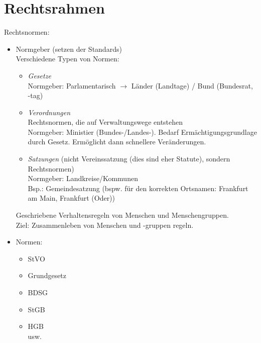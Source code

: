\section{Rechtsrahmen}
Rechtsnormen:
\begin{itemize}
\item Normgeber (setzen der Standards)\\
Verschiedene Typen von Normen:
\begin{itemize}
\item \emph{Gesetze}\\
Normgeber: Parlamentarisch $\to$ Länder (Landtage) / Bund (Bundesrat, -tag)
\item \emph{Verordnungen}\\
Rechtsnormen, die auf Verwaltungswege entstehen\\
Normgeber: Ministier (Bundes-/Landes-). Bedarf Ermächtigungsgrundlage durch Gesetz. Ermöglicht dann schnellere Veränderungen.
\item \emph{Satzungen} (nicht Vereinssatzung (dies sind eher Statute), sondern Rechtsnormen)\\
Normgeber: Landkreise/Kommunen\\
Bsp.: Gemeindesatzung (bspw. für den korrekten Ortsnamen: Frankfurt am Main, Frankfurt (Oder))
\end{itemize}
Geschriebene Verhaltensregeln von Menschen und Menschengruppen.\\
Ziel: Zusammenleben von Menschen und -gruppen regeln.
\item Normen:
\begin{itemize}
\item StVO
\item Grundgesetz
\item BDSG
\item StGB
\item HGB\\
usw.
\end{itemize}
\end{itemize}
